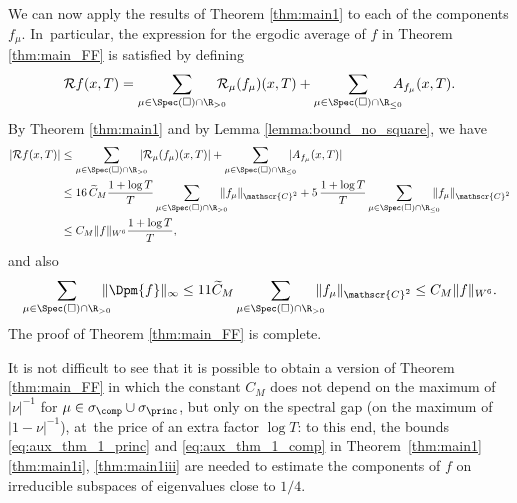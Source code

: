 We can now apply the results of Theorem \ref{thm:main1} to each of the components $f_\mu$.
In~particular, the expression for the ergodic average of $f$ in Theorem \ref{thm:main_FF} is satisfied by defining
\[
\mathcal{R}f(x,T) = \sum_{\mu \in \Spec(\square) \cap \R_{>0}}\hspace*{-3mm} \mathcal{R}_\mu (f_\mu) (x, T) + \sum_{\mu \in \Spec(\square) \cap \R_{\leq 0}}\hspace*{-3mm} A_{f_\mu}(x,T).
\]
By Theorem \ref{thm:main1} and by Lemma \ref{lemma:bound_no_square}, we have
\begin{equation*}
\begin{split}
|\mathcal{R}f(x,T)|&\leq \sum_{\mu \in \Spec(\square) \cap \R_{>0}}\hspace*{-3mm} |\mathcal{R}_\mu (f_\mu)(x, T)|+ \sum_{\mu \in \Spec(\square) \cap \R_{\leq 0}}\hspace*{-3mm} |A_{f_\mu}(x,T)|\\
&\leq 16 \, {\widetilde C_M} \frac{1+ \log T}{T} \sum_{\mu \in \Spec(\square) \cap \R_{>0}}\hspace*{-3mm} \|f_\mu\|_{\mathscr{C}^2}+ 5\, \frac{1+\log T}{T} \sum_{\mu \in \Spec(\square) \cap \R_{\leq 0}}\hspace*{-3mm} \|f_\mu\|_{\mathscr{C}^2} \\
&\leq C_M\|f \|_{W^6} \frac{1+ \log T}{T},
\end{split}
\end{equation*}
and also
\[
\sum_{\mu \in \Spec(\square) \cap \R_{>0}}\hspace*{-3mm} \|\Dpm{f}\|_{\infty} \leq 11 {\widetilde C_M} \sum_{\mu \in \Spec(\square) \cap \R_{>0}}\hspace*{-3mm}\|f_\mu \|_{\mathscr{C}^2} \leq C_M \|f \|_{W^6}.
\]
The proof of Theorem \ref{thm:main_FF} is complete.

\begin{remark}
It is not difficult to see that it is possible to obtain a version of Theorem \ref{thm:main_FF} in which the constant $C_M$ does not depend on the maximum of $|\nu|^{-1}$ for $\mu \in \sigma_{\comp} \cup \sigma_{\princ}$, but only on the spectral gap (\ie on the maximum of \hbox{$|1-\nu|^{-1}$}), at~the price of an extra factor $\log T$: to this end, the bounds \eqref{eq:aux_thm_1_princ} and \eqref{eq:aux_thm_1_comp} in Theorem~\ref{thm:main1}\eqref{thm:main1i}, \eqref{thm:main1iii} are needed to estimate the components of $f$ on irreducible subspaces of eigenvalues close to $1/4$.
\end{remark}

